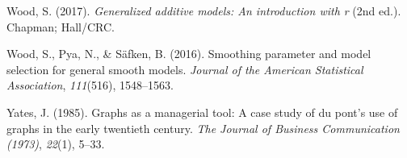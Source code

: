 \documentclass[print]{nuthesis}
\newlength{\cslhangindent}
\newenvironment{CSLReferences}[2]%
{\setlength{\parindent}{0pt}%
\everypar{\setlength{\hangindent}{\cslhangindent}}\ignorespaces}%
{\par}
\begin{document}
\begin{CSLReferences}{1}{0}
\leavevmode{}%
Wood, S. (2017). \emph{Generalized additive models: An introduction with r} (2nd ed.). Chapman; Hall/CRC.

\leavevmode{}%
Wood, S., Pya, N., \& Säfken, B. (2016). Smoothing parameter and model selection for general smooth models. \emph{Journal of the American Statistical Association}, \emph{111}(516), 1548--1563.

\leavevmode{}%
Yates, J. (1985). Graphs as a managerial tool: A case study of du pont's use of graphs in the early twentieth century. \emph{The Journal of Business Communication (1973)}, \emph{22}(1), 5--33.

\end{CSLReferences}


\backmatter

% 






\end{document}
